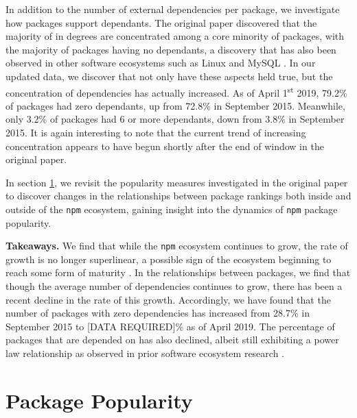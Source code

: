 \documentclass[10pt,conference]{IEEEtran}
\def\code#1{\texttt{#1}}
\begin{document}
In addition to the number of external dependencies per package, 
we investigate how packages support dependants. The original paper 
discovered that the majority of in degrees are concentrated among a core 
minority of packages, with the majority of packages having no dependants,
a discovery that has also been observed in other software ecosystems such
as Linux and MySQL \cite{Myers:2003}. In our updated data, we discover 
that not only have these aspects held true, but the concentration of 
dependencies has actually increased. As of April 1\textsuperscript{st} 2019, 79.2\% of packages
had zero dependants, up from 72.8\% in September 2015. Meanwhile, only 3.2\% of packages
had 6 or more dependants, down from 3.8\% in September 2015. It is again interesting to note
that the current trend of increasing concentration appears to have begun shortly after the end of window in the original
paper.

In section \ref{popularity}, we revisit the popularity measures
investigated in the original paper \cite{Wittern:2016} to discover
changes in the relationships between package rankings
both inside and outside of the \code{npm} ecosystem,
gaining insight into the dynamics of \code{npm} package popularity.

\textbf{Takeaways.} We find that while the \code{npm} ecosystem
continues to grow, the rate of growth is no longer superlinear, 
a possible sign of the ecosystem beginning to reach some form of maturity \cite{Alves:2011}.
In the relationships between packages, we find that though the average number
of dependencies continues to grow, there has been a recent decline in the
rate of this growth. Accordingly, we have found that the number of packages with
zero dependencies has increased from 28.7\% in September 2015 to [DATA REQUIRED]\%
as of April 2019. The percentage of packages that are depended on has
also declined, albeit still exhibiting a power law relationship as observed
in prior software ecosystem research \cite{Wittern:2016, Myers:2003, Louridas:2008}.


\section{Package Popularity}\label{popularity}
\end{document}
